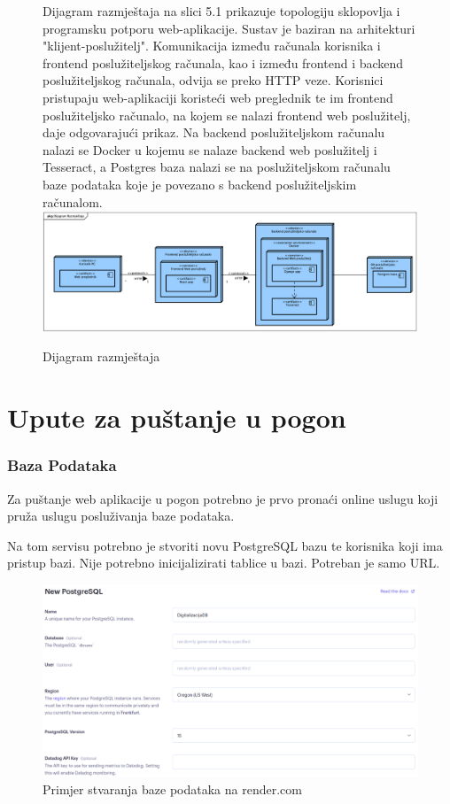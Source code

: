 			\begin{figure}[H]
				Dijagram razmještaja na slici 5.1 prikazuje topologiju sklopovlja i programsku potporu web-aplikacije. Sustav je baziran na arhitekturi
				"klijent-poslužitelj". Komunikacija između računala korisnika i frontend poslužiteljskog računala, kao i između frontend i backend poslužiteljskog
				računala, odvija se preko HTTP veze. Korisnici pristupaju web-aplikaciji koristeći web preglednik te im frontend poslužiteljsko računalo, na kojem
				se nalazi frontend web poslužitelj, daje odgovarajući prikaz. Na backend poslužiteljskom računalu nalazi se Docker u kojemu se nalaze backend web
				poslužitelj i Tesseract, a Postgres baza nalazi se na poslužiteljskom računalu baze podataka koje je povezano s backend poslužiteljskim računalom.
				\newline
				\includegraphics[width=\textwidth]{slike/Deployment.png}
				\caption{Dijagram razmještaja}
				\label{fig:Deployment}
			\end{figure}
			\eject 
		
		\section{Upute za puštanje u pogon}

			\subsubsection{Baza Podataka}

			Za puštanje web aplikacije u pogon potrebno je prvo pronaći online uslugu koji pruža uslugu posluživanja baze podataka.

			Na tom servisu potrebno je stvoriti novu PostgreSQL bazu te korisnika koji ima pristup bazi. Nije potrebno inicijalizirati
			tablice u bazi. Potreban je samo URL.

			\begin{figure}[H]
				\includegraphics[width=\textwidth]{slike/creatingDB.png}
				\caption{Primjer stvaranja baze podataka na render.com}
				\label{fig:stvaranje_baze}
			\end{figure}


